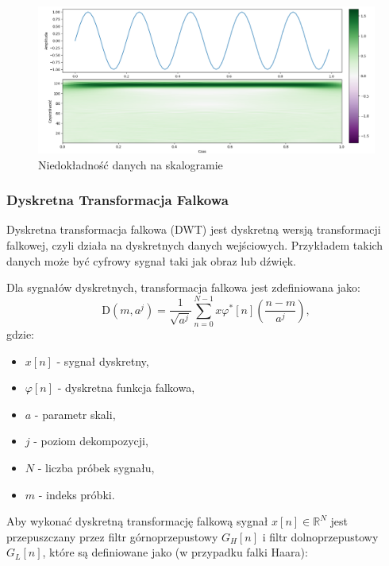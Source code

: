 \begin{figure}[ht]
    \centering
    \begin{minipage}[t]{0.55\linewidth}
        \includegraphics[width=\linewidth]{Rozdziały/02.Podstawy_teoretyczne/Obrazy/skalogram_sinus.png}
        \caption{Niedokładność danych na skalogramie}
        \label{fig:image40}
    \end{minipage}
\end{figure}

\newpage
\subsubsection{Dyskretna Transformacja Falkowa}

Dyskretna transformacja falkowa (DWT) jest dyskretną wersją transformacji falkowej, czyli działa na dyskretnych danych wejściowych. Przykładem takich danych może być cyfrowy sygnał taki jak obraz lub dźwięk. 

Dla sygnałów dyskretnych, transformacja falkowa jest zdefiniowana jako:
\begin{equation}
    \mathrm{D}\left(m, a^j\right)=\frac{1}{\sqrt{a^j}} \sum_{n=0}^{N-1} x\varphi^*[n] \left(\frac{n-m}{a^j}\right),
\end{equation}
gdzie:
\begin{itemize}
    \item $x[n]$ - sygnał dyskretny,
    \item $\varphi[n]$ - dyskretna funkcja falkowa,
    \item $a$ - parametr skali,
    \item $j$ - poziom dekompozycji,
    \item $N$ - liczba próbek sygnału,
    \item $m$ - indeks próbki.
\end{itemize}

Aby wykonać dyskretną transformację falkową sygnał $x[n] \in \mathbb{R}^N$ jest przepuszczany przez filtr górnoprzepustowy $G_H[n]$ i filtr dolnoprzepustowy $G_L[n]$, które są definiowane jako (w przypadku falki Haara):


